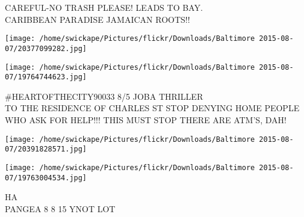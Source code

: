 \documentclass[10pt,letterpaper]{article}
\begin{document}
CAREFUL{-}NO TRASH PLEASE! LEADS TO BAY.\\
CARIBBEAN PARADISE JAMAICAN ROOTS!!
\pagebreak

\texttt{[image: /home/swickape/Pictures/flickr/Downloads/Baltimore 2015-08-07/20377099282.jpg]}

\vspace{0.25in}
\texttt{[image: /home/swickape/Pictures/flickr/Downloads/Baltimore 2015-08-07/19764744623.jpg]}

\#HEARTOFTHECITY90033 8/5 JOBA THRILLER\\
TO THE RESIDENCE OF CHARLES ST STOP DENYING HOME PEOPLE WHO ASK FOR HELP!!!  THIS MUST STOP THERE ARE ATM'S, DAH!
\pagebreak

\texttt{[image: /home/swickape/Pictures/flickr/Downloads/Baltimore 2015-08-07/20391828571.jpg]}

\vspace{0.25in}
\texttt{[image: /home/swickape/Pictures/flickr/Downloads/Baltimore 2015-08-07/19763004534.jpg]}

HA\\
PANGEA 8 8 15 YNOT LOT
\pagebreak
\end{document}
